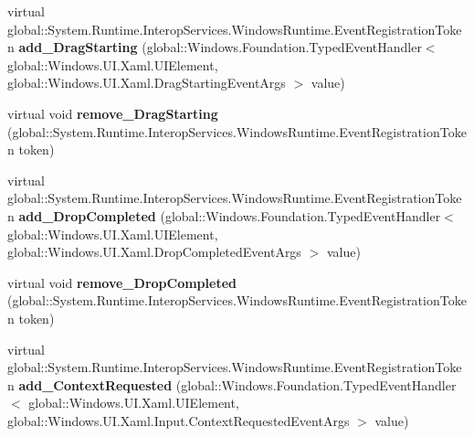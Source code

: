 \begin{DoxyCompactItemize}
\item 
\mbox{\label{class_windows_1_1_u_i_1_1_xaml_1_1_u_i_element_aef35e032bc4020dd68c6b12a4b83d69c}} 
virtual global\+::\+System.\+Runtime.\+Interop\+Services.\+Windows\+Runtime.\+Event\+Registration\+Token {\bfseries add\+\_\+\+Drag\+Starting} (global\+::\+Windows.\+Foundation.\+Typed\+Event\+Handler$<$ global\+::\+Windows.\+U\+I.\+Xaml.\+U\+I\+Element, global\+::\+Windows.\+U\+I.\+Xaml.\+Drag\+Starting\+Event\+Args $>$ value)
\item 
\mbox{\label{class_windows_1_1_u_i_1_1_xaml_1_1_u_i_element_ae2df4eabbc6b1dbc7a5a85a0866f4fba}} 
virtual void {\bfseries remove\+\_\+\+Drag\+Starting} (global\+::\+System.\+Runtime.\+Interop\+Services.\+Windows\+Runtime.\+Event\+Registration\+Token token)
\item 
\mbox{\label{class_windows_1_1_u_i_1_1_xaml_1_1_u_i_element_a55d6a19a803c9584cc9a54e02eb240aa}} 
virtual global\+::\+System.\+Runtime.\+Interop\+Services.\+Windows\+Runtime.\+Event\+Registration\+Token {\bfseries add\+\_\+\+Drop\+Completed} (global\+::\+Windows.\+Foundation.\+Typed\+Event\+Handler$<$ global\+::\+Windows.\+U\+I.\+Xaml.\+U\+I\+Element, global\+::\+Windows.\+U\+I.\+Xaml.\+Drop\+Completed\+Event\+Args $>$ value)
\item 
\mbox{\label{class_windows_1_1_u_i_1_1_xaml_1_1_u_i_element_a175ef186f4de5c6a422a88d8f42588e3}} 
virtual void {\bfseries remove\+\_\+\+Drop\+Completed} (global\+::\+System.\+Runtime.\+Interop\+Services.\+Windows\+Runtime.\+Event\+Registration\+Token token)
\item 
\mbox{\label{class_windows_1_1_u_i_1_1_xaml_1_1_u_i_element_af82e90640323c9da8621013a558c87f1}} 
virtual global\+::\+System.\+Runtime.\+Interop\+Services.\+Windows\+Runtime.\+Event\+Registration\+Token {\bfseries add\+\_\+\+Context\+Requested} (global\+::\+Windows.\+Foundation.\+Typed\+Event\+Handler$<$ global\+::\+Windows.\+U\+I.\+Xaml.\+U\+I\+Element, global\+::\+Windows.\+U\+I.\+Xaml.\+Input.\+Context\+Requested\+Event\+Args $>$ value)
\item 
\mbox{\label{class_windows_1_1_u_i_1_1_xaml_1_1_u_i_element_a41e65f1fea8389643eabe21d9861a727}} 

\end{DoxyCompactItemize}
